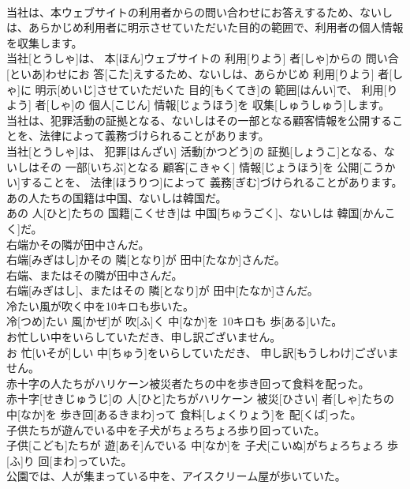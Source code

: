 \documentclass[8pt]{extreport}
\begin{document}
\begin{CJK}{UTF8}{min}
\\	当社は、本ウェブサイトの利用者からの問い合わせにお答えするため、ないしは、あらかじめ利用者に明示させていただいた目的の範囲で、利用者の個人情報を収集します。	
\\	当社[とうしゃ]は、 本[ほん]ウェブサイトの 利用[りよう] 者[しゃ]からの 問い合[といあ]わせにお 答[こた]えするため、ないしは、あらかじめ 利用[りよう] 者[しゃ]に 明示[めいじ]させていただいた 目的[もくてき]の 範囲[はんい]で、 利用[りよう] 者[しゃ]の 個人[こじん] 情報[じょうほう]を 収集[しゅうしゅう]します。
\\	当社は、犯罪活動の証拠となる、ないしはその一部となる顧客情報を公開することを、法律によって義務づけられることがあります。	
\\	当社[とうしゃ]は、 犯罪[はんざい] 活動[かつどう]の 証拠[しょうこ]となる、ないしはその 一部[いちぶ]となる 顧客[こきゃく] 情報[じょうほう]を 公開[こうかい]することを、 法律[ほうりつ]によって 義務[ぎむ]づけられることがあります。
\\	あの人たちの国籍は中国、ないしは韓国だ。	
\\	あの 人[ひと]たちの 国籍[こくせき]は 中国[ちゅうごく]、ないしは 韓国[かんこく]だ。
\\	右端かその隣が田中さんだ。	
\\	右端[みぎはし]かその 隣[となり]が 田中[たなか]さんだ。
\\	右端、またはその隣が田中さんだ。	
\\	右端[みぎはし]、またはその 隣[となり]が 田中[たなか]さんだ。
\\	冷たい風が吹く中を10キロも歩いた。	
\\	冷[つめ]たい 風[かぜ]が 吹[ふ]く 中[なか]を 10キロも 歩[ある]いた。
\\	お忙しい中をいらしていただき、申し訳ございません。	
\\	お 忙[いそが]しい 中[ちゅう]をいらしていただき、 申し訳[もうしわけ]ございません。
\\	赤十字の人たちがハリケーン被災者たちの中を歩き回って食料を配った。	
\\	赤十字[せきじゅうじ]の 人[ひと]たちがハリケーン 被災[ひさい] 者[しゃ]たちの 中[なか]を 歩き回[あるきまわ]って 食料[しょくりょう]を 配[くば]った。
\\	子供たちが遊んでいる中を子犬がちょろちょろ歩り回っていた。	
\\	子供[こども]たちが 遊[あそ]んでいる 中[なか]を 子犬[こいぬ]がちょろちょろ 歩[ふ]り 回[まわ]っていた。
\\	公園では、人が集まっている中を、アイスクリーム屋が歩いていた。	

\end{CJK}
\end{document}

